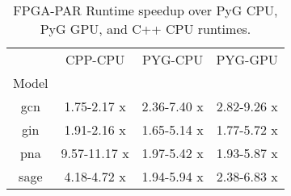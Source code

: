 \begin{table}
\caption{FPGA-PAR Runtime speedup over PyG CPU, PyG GPU, and C++ CPU runtimes.}
\label{tab:runtime_speedup}
\begin{tabular}{c | ccc}
\toprule
 & CPP-CPU & PYG-CPU & PYG-GPU \\
Model &  &  &  \\
\midrule
gcn & 1.75-2.17 x & 2.36-7.40 x & 2.82-9.26 x \\
gin & 1.91-2.16 x & 1.65-5.14 x & 1.77-5.72 x \\
pna & 9.57-11.17 x & 1.97-5.42 x & 1.93-5.87 x \\
sage & 4.18-4.72 x & 1.94-5.94 x & 2.38-6.83 x \\
\bottomrule
\end{tabular}
\end{table}
